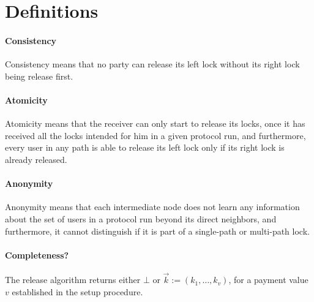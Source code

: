 \section{Definitions}

\paragraph{Consistency} Consistency means that no party can release its left lock without its 
right lock being release first.

\paragraph{Atomicity} Atomicity means that the receiver can only start to release its locks, once it 
has received all the locks intended for him in a given protocol run, and furthermore, every user in 
any path is able to release its left lock only if its right lock is already released. 

\paragraph{Anonymity} Anonymity means that each intermediate node does not learn any information about 
the set of users in a protocol run beyond its direct neighbors, and furthermore, it cannot distinguish 
if it is part of a single-path or multi-path lock.

\paragraph{Completeness?} The release algorithm returns either $\bot$ or $\vec{k} := (k_1,\ldots,
k_v)$, for a payment value $v$ established in the setup procedure.